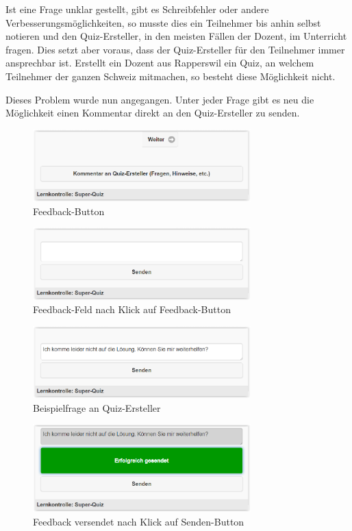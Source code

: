 Ist eine Frage unklar gestellt, gibt es Schreibfehler oder andere Verbesserungsmöglichkeiten, so musste dies ein Teilnehmer bis anhin selbst notieren und den Quiz-Ersteller, in den meisten Fällen der Dozent, im Unterricht fragen. Dies setzt aber voraus, dass der Quiz-Ersteller für den Teilnehmer immer ansprechbar ist. Erstellt ein Dozent aus Rapperswil ein Quiz, an welchem Teilnehmer der ganzen Schweiz mitmachen, so besteht diese Möglichkeit nicht.

Dieses Problem wurde nun angegangen. Unter jeder Frage gibt es neu die Möglichkeit einen Kommentar direkt an den Quiz-Ersteller zu senden.

\begin{figure}[H]
	\centering
	\includegraphics[width=0.75\textwidth]{Images/Feedback-Button.PNG}
	\caption{Feedback-Button}
\end{figure}

\begin{figure}[H]
	\centering
	\includegraphics[width=0.75\textwidth]{Images/Feedback-Feld.PNG}
	\caption{Feedback-Feld nach Klick auf Feedback-Button}
\end{figure}

\begin{figure}[H]
	\centering
	\includegraphics[width=0.75\textwidth]{Images/Feedback-Frage.PNG}
	\caption{Beispielfrage an Quiz-Ersteller}
\end{figure}

\begin{figure}[H]
	\centering
	\includegraphics[width=0.75\textwidth]{Images/Feedback-Frage-gesendet.PNG}
	\caption{Feedback versendet nach Klick auf Senden-Button}
\end{figure}


